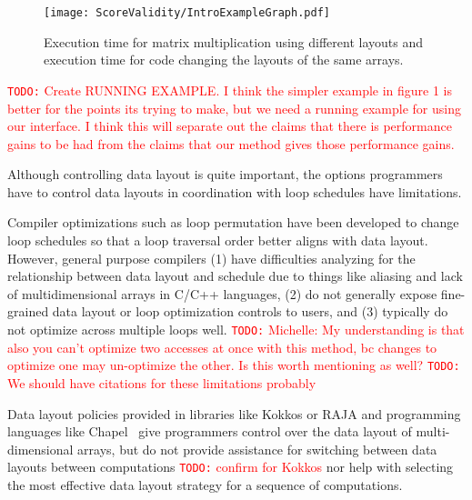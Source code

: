 \documentclass[sigconf, table]{acmart}
\newcommand{\todo}[1]{{\textcolor{red}{{\tt{TODO:}}\,\,#1 }}}
\begin{document}
\begin{figure}
	\texttt{[image: ScoreValidity/IntroExampleGraph.pdf]}
	\caption{Execution time for matrix multiplication using different layouts and execution time for code changing the layouts of the same arrays.}
	\label{IntroExample}
\end{figure}

\todo{Create RUNNING EXAMPLE. I think the simpler example in figure 1 is better for the points its trying to make, but we need a running example for using our interface. I think this will separate out the claims that there is performance gains to be had from the claims that our method gives those performance gains. }


Although controlling data layout is quite important, the options programmers have to control
data layouts in coordination with loop schedules have limitations.

Compiler optimizations such as loop permutation have been developed to change loop
schedules so that a loop traversal order better aligns with data layout.
However, general purpose compilers (1) have difficulties analyzing for the relationship between
data layout and schedule due to things like aliasing and lack of multidimensional arrays in 
C/C++ languages, (2) do not generally expose fine-grained data layout or loop optimization
controls to users, and (3) typically do not optimize across multiple loops well.
\todo{Michelle: My understanding is that also you can't optimize two accesses at once with this method, bc changes to optimize one may un-optimize the other. Is this worth mentioning as well?}
\todo{We should have citations for these limitations probably}

Data layout policies provided in libraries like Kokkos or RAJA
and programming languages like Chapel~\cite{diaconescu2007approach} give
programmers control over the data layout of multi-dimensional arrays, but do not 
provide assistance for switching between data layouts between computations \todo{confirm for Kokkos}
nor help with selecting the most effective data layout strategy for a sequence of computations.
\end{document}
